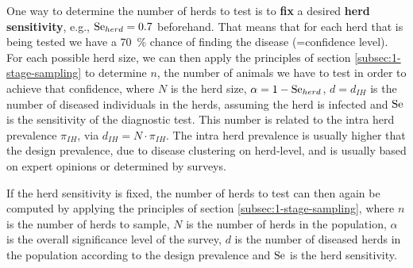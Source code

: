 \documentclass[nojss]{jss}
\begin{document}
One way to determine the number of herds to test is to \textbf{fix} a desired \textbf{herd sensitivity}, e.g., $\mbox{Se}_{herd} = 0.7$ beforehand. That means that for each herd that is being tested we have a 70~\% chance of finding the disease (=confidence level). For each possible herd size, we can then apply the principles of section \ref{subsec:1-stage-sampling} to determine $n$, the number of animals we have to test in order to achieve that confidence, where $N$ is the herd size, $\alpha = 1 - \mbox{Se}_{herd}$, $d=d_{IH}$ is the number of diseased individuals in the herds, assuming the herd is infected and $\mbox{Se}$ is the sensitivity   of the diagnostic test. This number is related to the intra herd prevalence   $\pi_{IH}$, via $d_{IH} = N\cdot \pi_{IH}$. The intra herd prevalence is usually higher that the design prevalence, due to disease clustering on herd-level, and is usually based on expert opinions or determined by surveys.

If the herd sensitivity   is fixed, the number of herds to test can then again be computed by applying the principles of section \ref{subsec:1-stage-sampling}, where $n$ is the number of herds to sample, $N$ is the number of herds in the population, $\alpha$ is the overall significance level    of the survey, $d$ is the number of diseased herds in the population according to the design prevalence   and $\mbox{Se}$ is the herd sensitivity.
\end{document}
